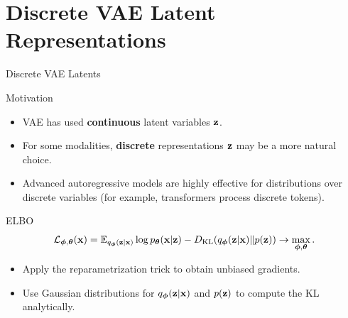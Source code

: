 \documentclass{beamer}
\renewcommand{\eqpause}{}
\begin{document}
\section{Discrete VAE Latent Representations}
\begin{frame}{Discrete VAE Latents}
	\begin{block}{Motivation}
		\begin{itemize}
			\item VAE has used \textbf{continuous} latent variables $\mathbf{z}$.
			\item For some modalities, \textbf{discrete} representations $\mathbf{z}$ may be a more natural choice.
			\item Advanced autoregressive models are highly effective for distributions over discrete variables (for example, transformers process discrete tokens).
		\end{itemize}
	\end{block}
	\eqpause
	\begin{block}{ELBO}
		\vspace{-0.3cm}
		\[
			\mathcal{L}_{\boldsymbol{\phi}, \boldsymbol{\theta}}(\mathbf{x})  = \mathbb{E}_{q_{\boldsymbol{\phi}}(\mathbf{z}| \mathbf{x})} \log p_{\boldsymbol{\theta}}(\mathbf{x}| \mathbf{z}) - D_\mathrm{KL}(q_{\boldsymbol{\phi}}(\mathbf{z}| \mathbf{x}) \| p(\mathbf{z})) \rightarrow \max_{\boldsymbol{\phi}, \boldsymbol{\theta}}.
		\]
		\vspace{-0.5cm}
	\end{block}
	\eqpause
	\begin{itemize}
		\item Apply the reparametrization trick to obtain unbiased gradients.
		\item Use Gaussian distributions for $q_{\boldsymbol{\phi}}(\mathbf{z}| \mathbf{x})$ and $p(\mathbf{z})$ to compute the KL analytically.
	\end{itemize}
\end{frame}
\end{document}
